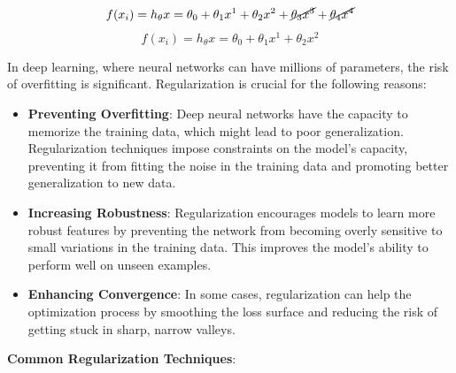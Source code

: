 \documentclass{report}
\begin{document}
$$f(x_i) = h_{\theta}x = \theta_0 + \theta_1 x^1 + \theta_2 x^2 + \cancel{\theta_3 x^3} + \cancel{\theta_4 x^4}$$
$$f(x_i) = h_{\theta}x = \theta_0 + \theta_1 x^1 + \theta_2 x^2$$

In deep learning, where neural networks can have millions of parameters, the risk of overfitting is significant. Regularization is crucial for the following reasons:
\begin{itemize}
\item \textbf{Preventing Overfitting}: Deep neural networks have the capacity to memorize the training data, which might lead to poor generalization. Regularization techniques impose constraints on the model's capacity, preventing it from fitting the noise in the training data and promoting better generalization to new data.

\item \textbf{Increasing Robustness}: Regularization encourages models to learn more robust features by preventing the network from becoming overly sensitive to small variations in the training data. This improves the model's ability to perform well on unseen examples.

\item \textbf{Enhancing Convergence}: In some cases, regularization can help the optimization process by smoothing the loss surface and reducing the risk of getting stuck in sharp, narrow valleys.
\end{itemize}

\textbf{Common Regularization Techniques}:
\end{document}
